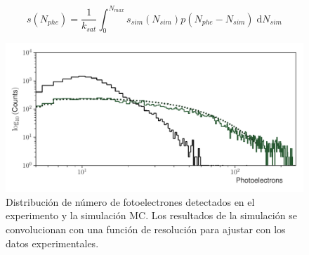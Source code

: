 \begin{equation}
\label{equ:nphe}
s(N_{phe})=\frac{1}{k_{sat}}\int_{0}^{N_{max}} s_{sim}(N_{sim})p(N_{phe}-N_{sim})\;\mathrm{d}N_{sim}
\end{equation}

\begin{figure}
        \centering
        \includegraphics[width=\textwidth]{photons-number.pdf}
        \caption{Distribución de número de fotoelectrones detectados en el experimento y la simulación MC. Los resultados de la simulación se convolucionan con una función de resolución para ajustar con los datos experimentales.}
        \label{fig:photons-number}
\end{figure}
